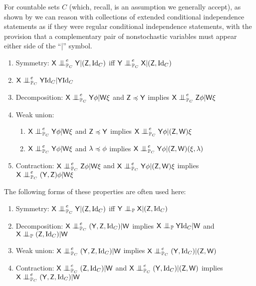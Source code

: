 For countable sets $C$ (which, recall, is an assumption we generally accept), as shown by \citet{constantinou_extended_2017} we can reason with collections of extended conditional independence statements as if they were regular conditional independence statements, with the provision that a complementary pair of nonstochastic variables must appear either side of the ``|'' symbol. 

\begin{enumerate}
    \item Symmetry: $\RV{X}\CI_{\prob{P}_C}^e \RV{Y}|(\RV{Z}, \mathrm{Id}_C)$ iff $\RV{Y}\CI_{\prob{P}_C}^e \RV{X}|(\RV{Z}, \mathrm{Id}_C)$
    \item $\RV{X}\CI_{\prob{P}_C}^e \RV{Y} \mathrm{Id}_C| \RV{Y} \mathrm{Id}_C$
    \item Decomposition: $\RV{X}\CI_{\prob{P}_C}^e \RV{Y} \phi|\RV{W}\xi$ and $\mathsf{Z}\preccurlyeq\mathsf{Y}$ implies $\RV{X}\CI_{\prob{P}_C}^e\RV{Z}\phi|\RV{W}\xi$
    \item Weak union:
    \begin{enumerate}
     	\item $\RV{X}\CI_{\prob{P}_C}^e \RV{Y} \phi|\RV{W}\xi$ and $\mathsf{Z}\preccurlyeq \mathsf{Y}$ implies $\RV{X}\CI_{\prob{P}_C}^e\RV{Y}\phi|(\RV{Z},\RV{W})\xi$
     	\item $\RV{X}\CI_{\prob{P}_C}^e \RV{Y} \phi|\RV{W}\xi$ and $\lambda\preccurlyeq \phi$ implies $\RV{X}\CI_{\prob{P}_C}^e\RV{Y}\phi|(\RV{Z},\RV{W})(\xi,\lambda)$
     \end{enumerate} 
    \item Contraction: $\RV{X}\CI_{\prob{P}_C}^e\RV{Z}\phi|\RV{W}\xi$ and $\RV{X}\CI_{\prob{P}_C}^e\RV{Y}\phi|(\RV{Z},\RV{W})\xi$ implies $\RV{X}\CI_{\prob{P}_C}^e(\RV{Y},\RV{Z})\phi|\RV{W}\xi$
\end{enumerate} 

The following forms of these properties are often used here:

\begin{enumerate}
    \item Symmetry: $\RV{X}\CI_{\prob{P}_C}^e \RV{Y}|(\RV{Z}, \mathrm{Id}_C)$ iff $\RV{Y}\CI_{\prob{P}} \RV{X}|(\RV{Z},\mathrm{Id}_C)$
    \item Decomposition: $\RV{X}\CI_{\prob{P}_C}^e (\RV{Y},\RV{Z}, \mathrm{Id}_C)|\RV{W}$ implies $\RV{X}\CI_{\prob{P}}\RV{Y}\mathrm{Id}_C|\RV{W}$ and $\RV{X}\CI_{\prob{P}}(\RV{Z},\mathrm{Id}_C)|\RV{W}$
    \item Weak union: $\RV{X}\CI_{\prob{P}_C}^e(\RV{Y},\RV{Z},\mathrm{Id}_C)|\RV{W}$ implies $\RV{X}\CI_{\prob{P}_C}^e(\RV{Y},\mathrm{Id}_C)|(\RV{Z},\RV{W})$
    \item Contraction: $\RV{X}\CI_{\prob{P}_C}^e(\RV{Z},\mathrm{Id}_C)|\RV{W}$ and $\RV{X}\CI_{\prob{P}_C}^e(\RV{Y},\mathrm{Id}_C)|(\RV{Z},\RV{W})$ implies $\RV{X}\CI_{\prob{P}_C}^e(\RV{Y},\RV{Z},\mathrm{Id}_C)|\RV{W}$
\end{enumerate}

